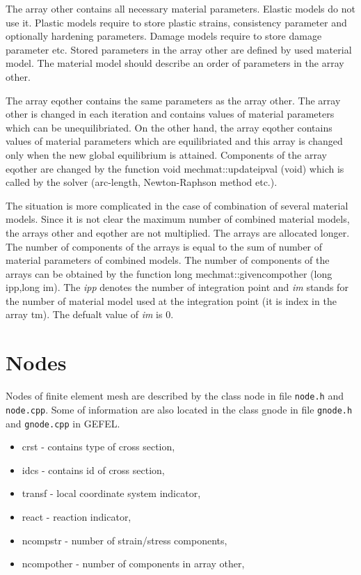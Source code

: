 The array {\sf other} contains all necessary material parameters. Elastic models do not use it. Plastic
models require to store plastic strains, consistency parameter and optionally hardening parameters.
Damage models require to store damage parameter etc. Stored parameters in the array {\sf other} are
defined by used material model. The material model should describe an order of parameters in the
array {\sf other}.

The array {\sf eqother} contains the same parameters as the array {\sf other}. The array {\sf other}
is changed in each iteration and contains values of material parameters which can be unequilibriated.
On the other hand, the array {\sf eqother} contains values of material parameters which are
equilibriated and this array is changed only when the new global equilibrium is attained.
Components of the array {\sf eqother} are changed by the function {\sf void mechmat::updateipval (void)}
which is called by the solver (arc-length, Newton-Raphson method etc.).

The situation is more complicated in the case of combination of several material models. Since it is
not clear the maximum number of combined material models, the arrays {\sf other} and {\sf eqother}
are not multiplied. The arrays are allocated longer. The number of components of the arrays is
equal to the sum of number of material parameters of combined models. The number of components
of the arrays can be obtained by the function {\sf long mechmat::givencompother (long ipp,long im)}.
The {\it ipp} denotes the number of integration point and {\it im} stands for the number of
material model used at the integration point (it is index in the array {\sf tm}).
The defualt value of {\it im} is 0.

\section{Nodes}

Nodes of finite element mesh are described by the class {\sf node} in file
{\tt node.h} and {\tt node.cpp}. Some of information are also located in
the class {\sf gnode} in file {\tt gnode.h} and {\tt gnode.cpp} in GEFEL.

\begin{itemize}
\item{{\sf crst} - contains type of cross section,}
\item{{\sf idcs} - contains id of cross section,}
\item{{\sf transf} - local coordinate system indicator,}
\item{{\sf react} - reaction indicator,}
\item{{\sf ncompstr} - number of strain/stress components,}
\item{{\sf ncompother} - number of components in array other,}
\end{itemize}


